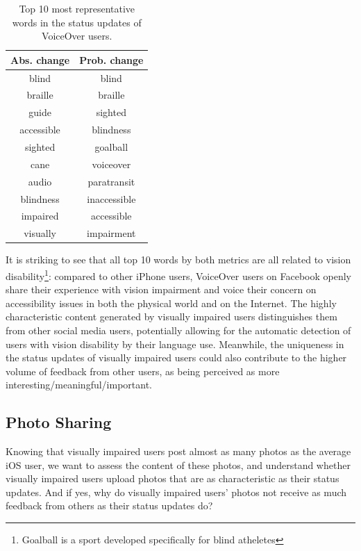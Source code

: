 \documentclass{sigchi}
\newcommand\tabhead[1]{\small\textbf{#1}}
\begin{document}
\begin{table}
  \centering
  \begin{tabular}{c|c}
    \hline
      \tabhead{Abs. change} & \tabhead{Prob. change} \\
    \hline
  blind & blind \\
  braille & braille \\
  guide & sighted \\
  accessible & blindness \\
  sighted & goalball \\
  cane & voiceover \\
  audio & paratransit \\
  blindness & inaccessible \\
  impaired & accessible \\
  visually & impairment \\
  \hline
  \end{tabular}
  \caption{Top 10 most representative words in the status updates of VoiceOver users. }
  \label{tab:status_top_words}
\end{table}

It is striking to see that all top 10 words by both metrics are all related to vision disability\footnote{Goalball is a sport developed specifically for blind atheletes}: compared to other iPhone users, VoiceOver users on Facebook openly share their experience with vision impairment and voice their concern on accessibility issues in both the physical world and on the Internet. The highly characteristic content generated by visually impaired users distinguishes them from other social media users, potentially allowing for the automatic detection of users with vision disability by their language use. Meanwhile, the uniqueness in the status updates of visually impaired users could also contribute to the higher volume of feedback from other users, as being perceived as more interesting/meaningful/important.



\subsection{Photo Sharing}
Knowing that visually impaired users post almost as many photos as the average iOS user, we want to assess the content of these photos, and understand whether visually impaired users upload photos that are as characteristic as their status updates. And if yes, why do visually impaired users' photos not receive as much feedback from others as their status updates do?
\end{document}
